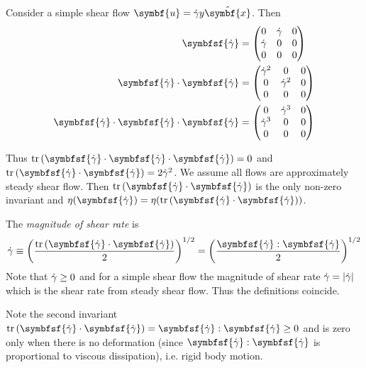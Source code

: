 \documentclass{jknotes}
\begin{document}
Consider a simple shear flow $\symbf{u} = \srate y \hat{\symbf{x}}$. Then
\begin{equation}
	\begin{aligned}
		\symbfsf{\srate} &= \begin{pmatrix} 0 & \srate & 0 \\ \srate & 0 & 0 \\
		0 & 0 & 0 \end{pmatrix} \\
			\symbfsf{\srate}\cdot\symbfsf{\srate} &= \begin{pmatrix} \srate^2 &
			0 & 0 \\ 0 & \srate^2 & 0 \\ 0 & 0 & 0 \end{pmatrix} \\
			\symbfsf{\srate}\cdot\symbfsf{\srate}\cdot\symbfsf{\srate} &=
			\begin{pmatrix} 0 & \srate^3 & 0 \\ \srate^3 & 0 & 0 \\
			0 & 0 & 0 \end{pmatrix}
		\end{aligned}
\end{equation}

Thus $\trace{\symbfsf{\srate}\cdot\symbfsf{\srate}\cdot\symbfsf{\srate}} = 0$ and
$\trace{\symbfsf{\srate}\cdot\symbfsf{\srate}} = 2\srate^2$. We assume all flows
are approximately steady shear flow. Then
$\trace{\symbfsf{\srate}\cdot\symbfsf{\srate}}$ is the only non-zero invariant
and $\eta(\symbfsf{\srate}) =
\eta(\trace{\symbfsf{\srate}\cdot\symbfsf{\srate}})$.

\begin{defn}
	The \emph{magnitude of shear rate} is
	\begin{equation}
		\srate \equiv
		\left(\frac{\trace{\symbfsf{\srate}\cdot\symbfsf{\srate}}}{2}\right)^{1/2}
		= \left(\frac{\symbfsf{\srate} : \symbfsf{\srate}}{2}\right)^{1/2}
	\end{equation}
	Note that $\dot{\gamma} \ge 0$ and for a simple shear flow the magnitude of
	shear rate $\dot{\gamma} = \abs{\dot{\gamma}}$ which is the shear rate from steady
	shear flow. Thus the definitions coincide.
\end{defn}

Note the second invariant $\trace{\symbfsf{\srate}\cdot\symbfsf{\srate}} =
\symbfsf{\srate}:\symbfsf{\srate} \ge 0$ and is zero only when there is no
deformation (since $\symbfsf{\srate}:\symbfsf{\srate}$ is proportional to
viscous dissipation), i.e. rigid body motion.
\end{document}
